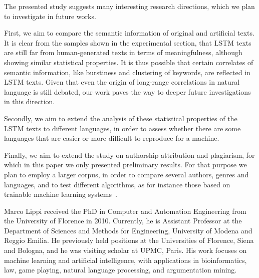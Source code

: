 \documentclass[journal]{IEEEtran}
\begin{document}
The presented study suggests many interesting research directions, which we plan to investigate in future works.

First, we aim to compare the semantic information of original and artificial texts. It is clear from the samples shown in the experimental section, that LSTM texts are still far from human-generated texts in terms of meaningfulness, although showing similar statistical properties. It is thus possible that certain correlates of semantic information, like burstiness and clustering of keywords, are reflected in LSTM texts. Given that even the origin of long-range correlations in natural language is still debated, our work paves the way to deeper future investigations in this direction.

Secondly, we aim to extend the analysis of these statistical properties of the LSTM texts to different languages, in order to assess whether there are some languages that are easier or more difficult to reproduce for a machine.

Finally, we aim to extend the study on authorship attribution and plagiarism, for which in this paper we only presented preliminary results. For that purpose we plan to employ a larger corpus, in order to compare several authors, genres and languages, and to test different algorithms, as for instance those based on trainable machine learning systems~\cite{Neme2015,Jockers2010}.







%

\begin{IEEEbiography}{Marco Lippi} received the PhD in Computer
and Automation Engineering from the University of Florence in 2010.
Currently, he is Assistant Professor at the Department of Sciences and
Methods for Engineering, University of Modena and Reggio Emilia. He previously
held positions at the Universities of Florence, Siena and Bologna, and he was
visiting scholar at UPMC, Paris.
His work focuses on machine learning and artificial intelligence, with
applications in bioinformatics, law, game playing, natural
language processing, and argumentation mining.
\end{IEEEbiography}
\end{document}

